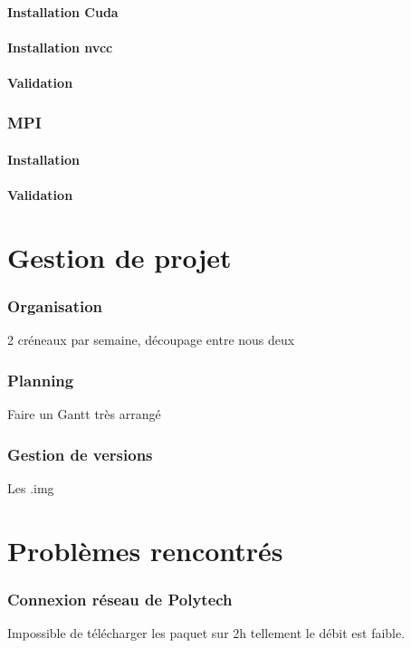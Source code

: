 \documentclass[final]{polytech/polytech}
\begin{document}
\subsection{Installation Cuda}

\subsection{Installation nvcc}

\subsection{Validation}

\section{MPI}

\subsection{Installation}

\subsection{Validation}

\part{Gestion de projet}

\section{Organisation}
2 créneaux par semaine, découpage entre nous deux

\section{Planning}
Faire un Gantt très arrangé

\section{Gestion de versions}
Les .img

\part{Problèmes rencontrés}

\section{Connexion réseau de Polytech}
Impossible de télécharger les paquet sur 2h tellement le débit est faible.
\end{document}
